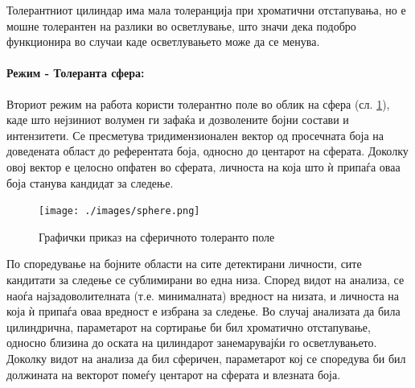 \documentclass[11pt]{article}
\newcommand\norm[1]{\left\lVert#1\right\rVert}
\renewcommand{\vec}[1]{\mathbf{#1}}
\begin{document}
        Толерантниот цилиндар има мала толеранција при хроматични отстапувања, но е мошне толерантен на разлики во осветлување, што значи дека подобро функционира во случаи каде осветлувањето може да се менува.

      \paragraph{Режим - Толеранта сфера:\\}
        Вториот режим на работа користи толерантно поле во облик на сфера (сл. \ref{fig:sphere}), каде што нејзиниот волумен ги зафаќа и дозволените бојни состави и интензитети. Се пресметува тридимензионален вектор од просечната боја на доведената област до референтата боја, односно до центарот на сферата. Доколку овој вектор е целосно опфатен во сферата, личноста на која што ѝ припаѓа оваа боја станува кандидат за следење.
        \begin{figure}[H]
          \centering
          \texttt{[image: ./images/sphere.png]}
          \label{fig:sphere}
          \caption{Графички приказ на сферичното толеранто поле}
        \end{figure}

        По споредување на бојните области на сите детектирани личности, сите кандитати за следење се сублимирани во една низа. Според видот на анализа, се наоѓа најзадоволителната (т.е. минималната) вредност на низата, и личноста на која ѝ припаѓа оваа вредност е избрана за следење. Во случај анализата да била цилиндрична, параметарот на сортирање би бил хроматично отстапување, односно близина до оската на цилиндарот занемарувајќи го осветлувањето. Доколку видот на анализа да бил сферичен, параметарот кој се споредува би бил должината на векторот помеѓу центарот на сферата и влезната боја.
\end{document}
